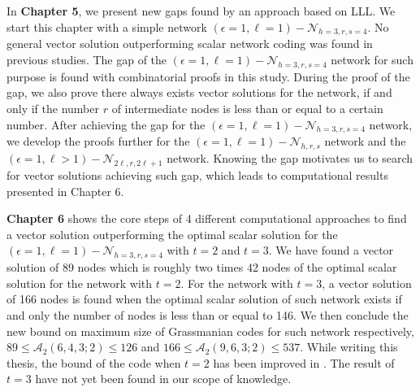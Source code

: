 In \textbf{Chapter 5}, we present new gaps found by an approach based
on LLL. We start this chapter with a simple network $\left(\epsilon=1,\ell=1\right)-\mathcal{N}_{h=3,r,s=4}$.
No general vector solution outperforming scalar network coding was
found in previous studies. The gap of the $\left(\epsilon=1,\ell=1\right)-\mathcal{N}_{h=3,r,s=4}$
network for such purpose is found with combinatorial proofs in this
study. During the proof of the gap, we also prove there always exists
vector solutions for the network, if and only if the number $r$ of
intermediate nodes is less than or equal to a certain number. After
achieving the gap for the $\left(\epsilon=1,\ell=1\right)-\mathcal{N}_{h=3,r,s=4}$
network, we develop the proofs further for the $\left(\epsilon=1,\ell=1\right)-\mathcal{N}_{h,r,s}$
network and the $\left(\epsilon=1,\ell>1\right)-\mathcal{N}_{2\ell,r,2\ell+1}$
network. Knowing the gap motivates us to search for vector solutions
achieving such gap, which leads to computational results presented
in Chapter 6.

\textbf{Chapter 6} shows the core steps of 4 different computational
approaches to find a vector solution outperforming the optimal scalar
solution for the $\left(\epsilon=1,\ell=1\right)-\mathcal{N}_{h=3,r,s=4}$
with $t=2$ and $t=3$. We have found a vector solution of 89 nodes
which is roughly two times 42 nodes of the optimal scalar solution
for the network with $t=2$. For the network with $t=3$, a vector
solution of 166 nodes is found when the optimal scalar solution of
such network exists if and only the number of nodes is less than or
equal to 146. We then conclude the new bound on maximum size of Grassmanian
codes for such network respectively, $89\leq\mathcal{A}_{2}\left(6,4,3;2\right)\leq126$
and $166\leq\mathcal{A}_{2}\left(9,6,3;2\right)\leq537$. While writing
this thesis, the bound of the code when $t=2$ has been improved in
\cite{Etzion:2018}. The result of $t=3$ have not yet been found
in our scope of knowledge. 

\clearpage
